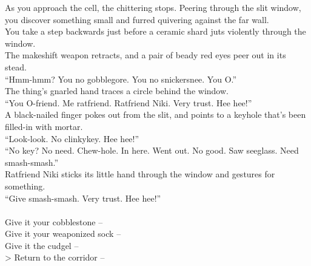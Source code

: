 As you approach the cell, the chittering stops. Peering through the slit window, you discover something small and furred quivering against the far wall.\\

You take a step backwards just before a ceramic shard juts violently through the window.\\

The makeshift weapon retracts, and a pair of beady red eyes peer out in its stead.\\
“Hmm-hmm? You no gobblegore. You no snickersnee. You O.”\\

The thing’s gnarled hand traces a circle behind the window.\\
“You O-friend. Me ratfriend. Ratfriend Niki. Very trust. Hee hee!”\\

A black-nailed finger pokes out from the slit, and points to a keyhole that’s been filled-in with mortar.\\
“Look-look. No clinkykey. Hee hee!”\\

“No key? No need. Chew-hole. In here. Went out. No good. Saw seeglass. Need smash-smash.”\\

Ratfriend Niki sticks its little hand through the window and gestures for something.\\
“Give smash-smash. Very trust. Hee hee!”\\

 \\

 Give it your cobblestone -- \\
 Give it your weaponized sock -- \\
 Give it the cudgel -- \\

> Return to the corridor -- 